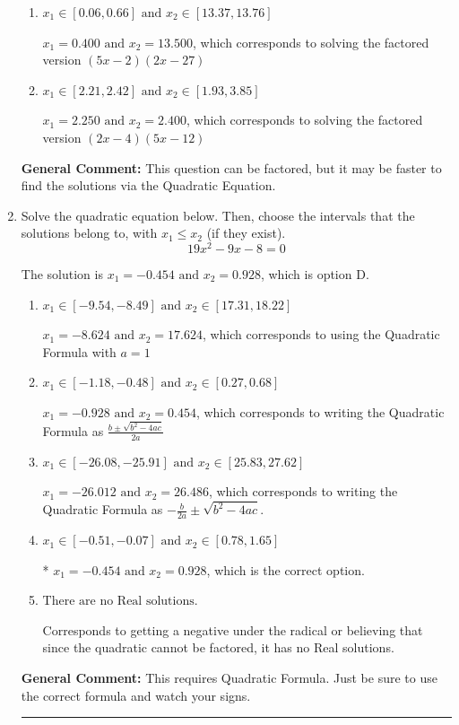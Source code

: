 \documentclass{extbook}[14pt]
\newcommand{\litem}[1]{\item #1

\rule{\textwidth}{0.4pt}}
\begin{document}
\begin{enumerate}
{\begin{enumerate}[label=\Alph*.]
$x_1 = 12.000 \text{ and } x_2 = 45.000$, which corresponds to solving the factored version $(x -12)(x -45)$
\item \( x_1 \in [0.06, 0.66] \text{ and } x_2 \in [13.37, 13.76] \)

$x_1 = 0.400 \text{ and } x_2 = 13.500$, which corresponds to solving the factored version $(5x -2)(2x -27)$
\item \( x_1 \in [2.21, 2.42] \text{ and } x_2 \in [1.93, 3.85] \)

$x_1 = 2.250 \text{ and } x_2 = 2.400$, which corresponds to solving the factored version $(2x -4)(5x -12)$
\end{enumerate}

\textbf{General Comment:} This question can be factored, but it may be faster to find the solutions via the Quadratic Equation.
}
\litem{
Solve the quadratic equation below. Then, choose the intervals that the solutions belong to, with $x_1 \leq x_2$ (if they exist).
\[ 19x^{2} -9 x -8 = 0 \]

The solution is \( x_1 = -0.454 \text{ and } x_2 = 0.928 \), which is option D.\begin{enumerate}[label=\Alph*.]
\item \( x_1 \in [-9.54, -8.49] \text{ and } x_2 \in [17.31, 18.22] \)

 $x_1 = -8.624 \text{ and } x_2 = 17.624$, which corresponds to using the Quadratic Formula with $a=1$
\item \( x_1 \in [-1.18, -0.48] \text{ and } x_2 \in [0.27, 0.68] \)

 $x_1 = -0.928 \text{ and } x_2 = 0.454$, which corresponds to writing the Quadratic Formula as $\frac{b \pm \sqrt{b^2 - 4ac}}{2a}$
\item \( x_1 \in [-26.08, -25.91] \text{ and } x_2 \in [25.83, 27.62] \)

 $x_1 = -26.012 \text{ and } x_2 = 26.486$, which corresponds to writing the Quadratic Formula as $-\frac{b}{2a} \pm \sqrt{b^2 - 4ac}$.
\item \( x_1 \in [-0.51, -0.07] \text{ and } x_2 \in [0.78, 1.65] \)

* $x_1 = -0.454 \text{ and } x_2 = 0.928$, which is the correct option.
\item \( \text{There are no Real solutions.} \)

Corresponds to getting a negative under the radical or believing that since the quadratic cannot be factored, it has no Real solutions.
\end{enumerate}

\textbf{General Comment:} This requires Quadratic Formula. Just be sure to use the correct formula and watch your signs.
}
\end{enumerate}
\end{document}
